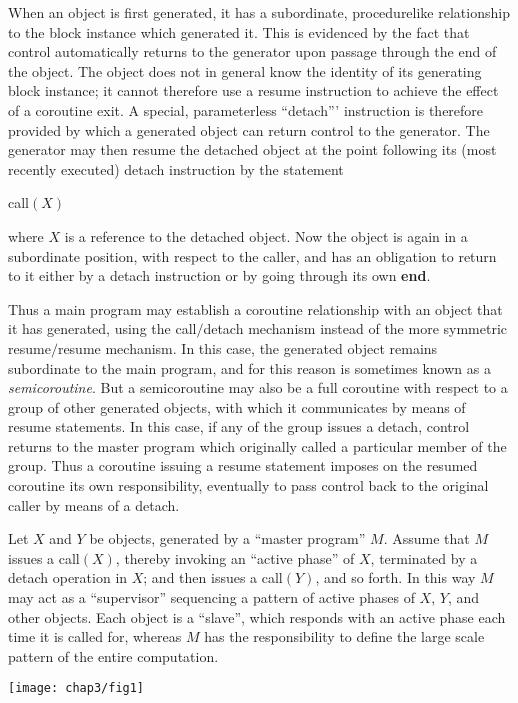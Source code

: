 When an object is first generated, it has a subordinate, procedurelike relationship to the block instance which generated it. This is evidenced by the fact that control automatically returns to the generator upon passage through the end of the object. The object does not in general know the identity of its generating block instance; it cannot therefore use a resume instruction to achieve the effect of a coroutine exit. A special, parameterless ``detach''' instruction is therefore provided by which a generated object can return control to the generator. The generator may then resume the detached object at the point following its (most recently executed) detach instruction by the
statement

\quad call$(X)$

\noindent
where $X$ is a reference to the detached object. Now the object is again in a subordinate position, with respect to the caller, and has an obligation to return to it either by a detach instruction or by going through its own \textbf{end}.

Thus a main program may establish a coroutine relationship with an object that it has generated, using the call$/$detach mechanism instead of the more symmetric resume$/$resume mechanism. In this case, the generated object remains subordinate to the main program, and for this reason is sometimes known as a \textit{semicoroutine}. But a semicoroutine may also be a full coroutine with respect to a group of other generated objects, with which it communicates by means of resume statements. In this case, if any of the group issues a detach, control returns to the master program which originally called a particular member of the group. Thus a coroutine issuing a resume statement imposes on the resumed coroutine its own responsibility, eventually to pass control back to the original caller by means of a detach.

Let $X$ and $Y$ be objects, generated by a ``master program'' $M$. Assume that $M$ issues a call$(X)$, thereby invoking an ``active phase'' of $X$, terminated by a detach operation in $X$; and then issues a call$(Y)$, and so forth. In this way $M$ may act as a ``supervisor'' sequencing a pattern of active phases of $X$, $Y$, and other objects. Each object is a ``slave'', which responds with an active phase each time it is called for, whereas $M$ has the responsibility to define the large scale pattern of the entire computation.
\begin{center}
	\texttt{[image: chap3/fig1]}
\end{center}

